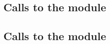 \subsection{Calls to the \wcpMod{} module}     \label{system transaction: module calls: wcp calls}       
\subsection{Calls to the \eucMod{} module}     \label{system transaction: module calls: euc calls}       
